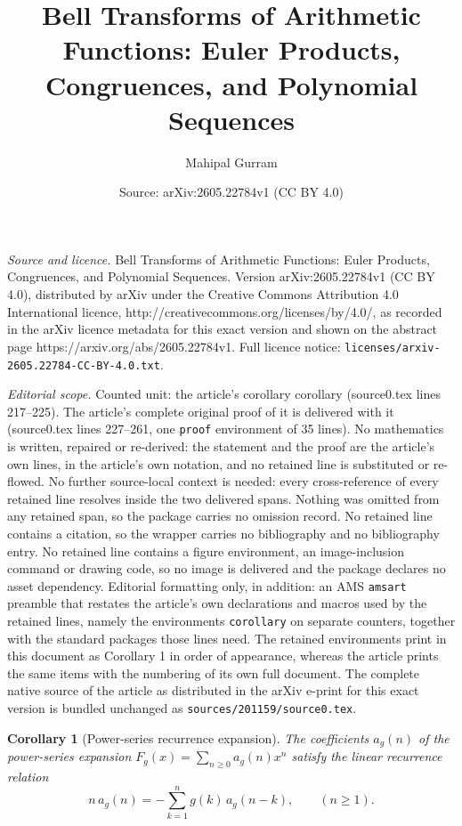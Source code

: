 \documentclass[10pt,a4paper]{amsart}
\title{Bell Transforms of Arithmetic Functions: Euler Products, Congruences, and Polynomial Sequences}
\author{Mahipal Gurram}
\date{Source: arXiv:2605.22784v1 (CC BY 4.0)}
\newtheorem{corollary}{Corollary}
\begin{document}
\maketitle

\noindent\emph{Source and licence.} Bell Transforms of Arithmetic Functions: Euler Products, Congruences, and Polynomial Sequences. Version arXiv:2605.22784v1 (CC BY 4.0), distributed by arXiv under the Creative Commons Attribution 4.0 International licence, http://creativecommons.org/licenses/by/4.0/, as recorded in the arXiv licence metadata for this exact version and shown on the abstract page https://arxiv.org/abs/2605.22784v1. Full licence notice: \texttt{licenses/arxiv-2605.22784-CC-BY-4.0.txt}.\par\smallskip

\noindent\textit{Editorial scope.} Counted unit: the article's corollary corollary (source0.tex lines 217--225). The article's complete original proof of it is delivered with it (source0.tex lines 227--261, one \texttt{proof} environment of 35 lines). No mathematics is written, repaired or re-derived: the statement and the proof are the article's own lines, in the article's own notation, and no retained line is substituted or re-flowed.  No further source-local context is needed: every cross-reference of every retained line resolves inside the two delivered spans.  Nothing was omitted from any retained span, so the package carries no omission record.  No retained line contains a citation, so the wrapper carries no bibliography and no bibliography entry.  No retained line contains a figure environment, an image-inclusion command or drawing code, so no image is delivered and the package declares no asset dependency.  Editorial formatting only, in addition: an AMS \texttt{amsart} preamble that restates the article's own declarations and macros used by the retained lines, namely the environments \texttt{corollary} on separate counters, together with the standard packages those lines need.  The retained environments print in this document as Corollary 1 in order of appearance, whereas the article prints the same items with the numbering of its own full document.  The complete native source of the article as distributed in the arXiv e-print for this exact version is bundled unchanged as \texttt{sources/201159/source0.tex}.
\begin{corollary}[Power-series recurrence expansion]
The coefficients \(a_g(n)\) of the power-series expansion \(F_g(x) = \sum_{n\ge0}a_g(n)x^n\) satisfy the linear recurrence relation
\[
n\,a_g(n)
=
-\sum_{k=1}^n g(k)\,a_g(n-k),
\qquad (n\ge1).
\]
\end{corollary}
\end{document}
